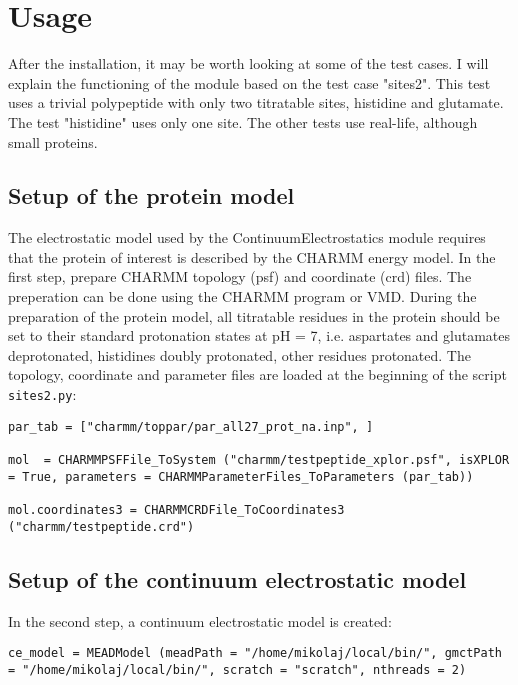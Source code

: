 \documentclass[a4paper,11pt]{article}
\newcommand{\modulename}{ContinuumElectrostatics\xspace}
\begin{document}
\section{Usage}
After the installation, it may be worth looking at some of the test cases.
%
I will explain the functioning of the module based on the test case "sites2".
%
This test uses a trivial polypeptide with only two titratable sites, 
histidine and glutamate. 
%
The test "histidine" uses only one site. The other tests use real-life, 
although small proteins.


\subsection{Setup of the protein model}
The electrostatic model used by the \modulename module requires that the protein 
of interest is described by the CHARMM energy model.
%
In the first step, prepare CHARMM topology (psf) and coordinate (crd) files. 
%
The preperation can be done using the CHARMM program or VMD.
%
During the preparation of the protein model, all titratable residues in the protein 
should be set to their standard protonation states at pH = 7, i.e. aspartates 
and glutamates deprotonated, histidines doubly protonated, other residues 
protonated.
%
The topology, coordinate and parameter files are loaded at the
beginning of the script \texttt{sites2.py}:

{\footnotesize \begin{lstlisting}
par_tab = ["charmm/toppar/par_all27_prot_na.inp", ]

mol  = CHARMMPSFFile_ToSystem ("charmm/testpeptide_xplor.psf", isXPLOR = True, parameters = CHARMMParameterFiles_ToParameters (par_tab))

mol.coordinates3 = CHARMMCRDFile_ToCoordinates3 ("charmm/testpeptide.crd")
\end{lstlisting} }


\subsection{Setup of the continuum electrostatic model}
In the second step, a continuum electrostatic model is created:

{\footnotesize \begin{lstlisting}
ce_model = MEADModel (meadPath = "/home/mikolaj/local/bin/", gmctPath = "/home/mikolaj/local/bin/", scratch = "scratch", nthreads = 2)
\end{lstlisting} }
\end{document}
